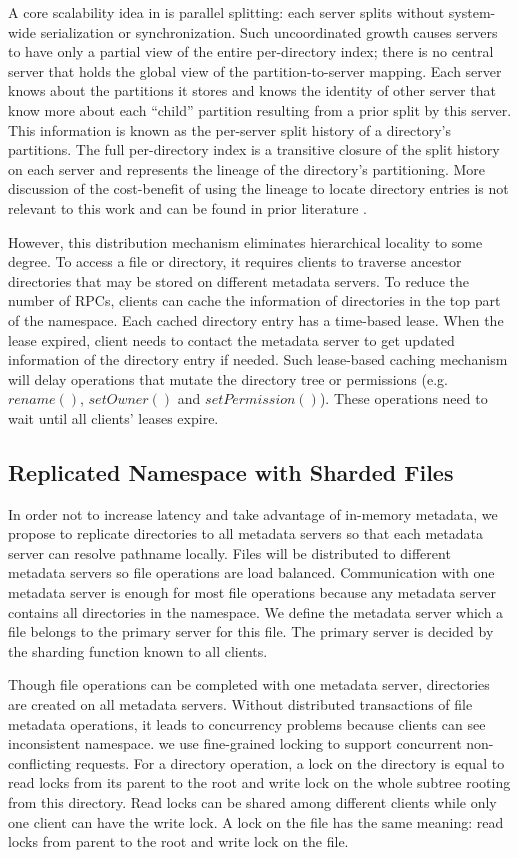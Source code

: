 A core scalability idea in \giga is parallel splitting: each server splits
without system-wide serialization or synchronization.
Such uncoordinated growth causes \giga servers to have only a partial view of
the entire per-directory index;
there is no central server that holds the global view of the
partition-to-server mapping.
Each server knows about the partitions it stores and knows the
identity of other server that know more about each ``child'' partition
resulting from a prior split by this server.
This information is known as the per-server split history of
a directory's partitions.
The full per-directory \giga index is
a transitive closure of the split history on each
server and represents the lineage of the directory's partitioning.
More discussion of the cost-benefit of using
the lineage to locate directory entries is not relevant
to this work and can be found in prior \giga{} literature \cite{GIGA07, GIGA11}.

However, this distribution mechanism eliminates hierarchical locality to
some degree. To access a file or directory, it requires clients to
traverse ancestor directories that may be stored on different metadata servers.
To reduce the number of RPCs, clients can cache the information of
directories in the top part of the namespace.
Each cached directory entry has a time-based lease.
When the lease expired, client needs to contact the metadata server
to get updated information of the directory entry if needed.
Such lease-based caching mechanism will delay operations that
mutate the directory tree or permissions (e.g. $rename()$,
$setOwner()$ and $setPermission()$).
These operations need to wait until all clients' leases expire.

\subsection{Replicated Namespace with Sharded Files}

In order not to increase  latency and take advantage of in-memory metadata, we propose to replicate directories to all metadata servers so that each metadata server can resolve pathname locally. Files will be distributed to different metadata servers so file operations are load balanced. Communication with one metadata server is enough for most file operations because any metadata server contains all directories in the namespace. We define the metadata server which a file belongs to the primary server for this file. The primary server is decided by the sharding function known to all clients.

Though file operations can be completed with one metadata server, directories are created on all metadata servers. Without distributed transactions of file metadata operations, it leads to concurrency problems because clients can see inconsistent namespace.
we use fine-grained locking to support concurrent non-conflicting requests.
For a directory operation, a lock on the directory is equal to read locks from its parent to the root and write lock on the whole subtree rooting from this directory. Read locks can be shared among different clients while only one client can have the write lock. 
A lock on the file has the same meaning: read locks from parent to the root and write lock on the file.


